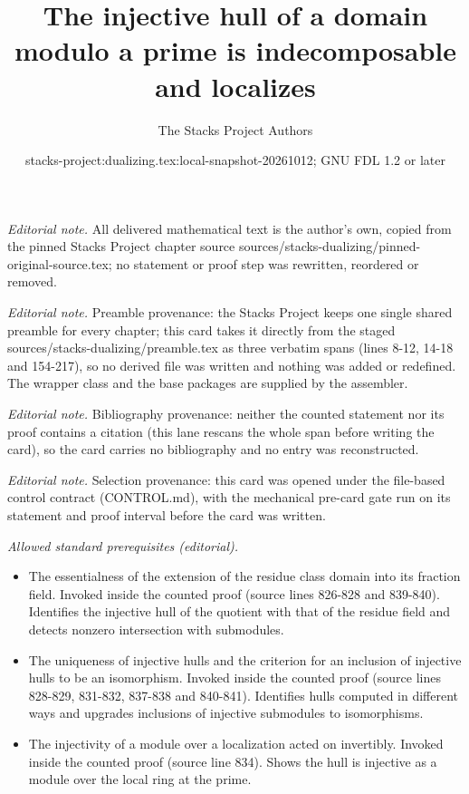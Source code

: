 \documentclass[10pt,a4paper]{amsart}
\title{The injective hull of a domain modulo a prime is indecomposable and localizes}
\author{The Stacks Project Authors}
\date{stacks-project:dualizing.tex:local-snapshot-20261012; GNU FDL 1.2 or later}
\theoremstyle{plain}
\theoremstyle{definition}
\theoremstyle{remark}
\numberwithin{equation}{subsection}
\begin{document}
\maketitle
\noindent\textit{Editorial note.} All delivered mathematical text is the author's own, copied from the pinned Stacks Project chapter source sources/stacks-dualizing/pinned-original-source.tex; no statement or proof step was rewritten, reordered or removed.\par\medskip
\noindent\textit{Editorial note.} Preamble provenance: the Stacks Project keeps one single shared preamble for every chapter; this card takes it directly from the staged sources/stacks-dualizing/preamble.tex as three verbatim spans (lines 8-12, 14-18 and 154-217), so no derived file was written and nothing was added or redefined. The wrapper class and the base packages are supplied by the assembler.\par\medskip
\noindent\textit{Editorial note.} Bibliography provenance: neither the counted statement nor its proof contains a citation (this lane rescans the whole span before writing the card), so the card carries no bibliography and no entry was reconstructed.\par\medskip
\noindent\textit{Editorial note.} Selection provenance: this card was opened under the file-based control contract (CONTROL.md), with the mechanical pre-card gate run on its statement and proof interval before the card was written.\par\medskip
\noindent\textit{Allowed standard prerequisites (editorial).}\begin{itemize}
\item The essentialness of the extension of the residue class domain into its fraction field. Invoked inside the counted proof (source lines 826-828 and 839-840). Identifies the injective hull of the quotient with that of the residue field and detects nonzero intersection with submodules.
\item The uniqueness of injective hulls and the criterion for an inclusion of injective hulls to be an isomorphism. Invoked inside the counted proof (source lines 828-829, 831-832, 837-838 and 840-841). Identifies hulls computed in different ways and upgrades inclusions of injective submodules to isomorphisms.
\item The injectivity of a module over a localization acted on invertibly. Invoked inside the counted proof (source line 834). Shows the hull is injective as a module over the local ring at the prime.
\end{itemize}\medskip
\end{document}
